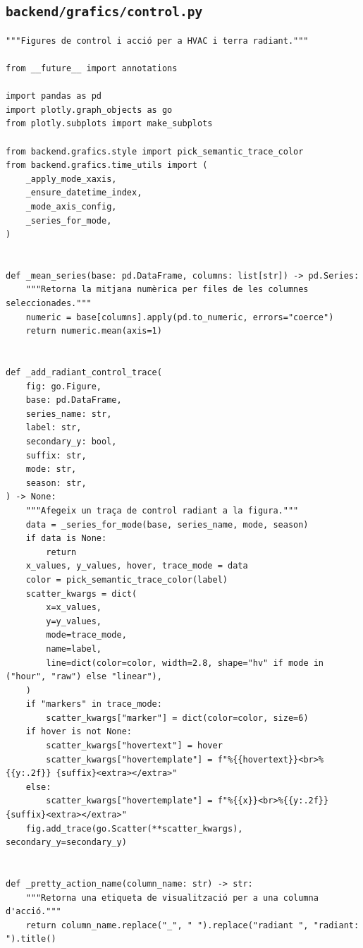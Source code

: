 \documentclass[10pt,a4paper]{article}
\begin{document}

\subsection{\texorpdfstring{\texttt{backend/grafics/control.py}}{backend/grafics/control.py}}

\begin{lstlisting}[style=studioPython,caption={backend/grafics/control.py},label={lst:backend-grafics-control-py}]
"""Figures de control i acció per a HVAC i terra radiant."""

from __future__ import annotations

import pandas as pd
import plotly.graph_objects as go
from plotly.subplots import make_subplots

from backend.grafics.style import pick_semantic_trace_color
from backend.grafics.time_utils import (
    _apply_mode_xaxis,
    _ensure_datetime_index,
    _mode_axis_config,
    _series_for_mode,
)


def _mean_series(base: pd.DataFrame, columns: list[str]) -> pd.Series:
    """Retorna la mitjana numèrica per files de les columnes seleccionades."""
    numeric = base[columns].apply(pd.to_numeric, errors="coerce")
    return numeric.mean(axis=1)


def _add_radiant_control_trace(
    fig: go.Figure,
    base: pd.DataFrame,
    series_name: str,
    label: str,
    secondary_y: bool,
    suffix: str,
    mode: str,
    season: str,
) -> None:
    """Afegeix un traça de control radiant a la figura."""
    data = _series_for_mode(base, series_name, mode, season)
    if data is None:
        return
    x_values, y_values, hover, trace_mode = data
    color = pick_semantic_trace_color(label)
    scatter_kwargs = dict(
        x=x_values,
        y=y_values,
        mode=trace_mode,
        name=label,
        line=dict(color=color, width=2.8, shape="hv" if mode in ("hour", "raw") else "linear"),
    )
    if "markers" in trace_mode:
        scatter_kwargs["marker"] = dict(color=color, size=6)
    if hover is not None:
        scatter_kwargs["hovertext"] = hover
        scatter_kwargs["hovertemplate"] = f"%{{hovertext}}<br>%{{y:.2f}} {suffix}<extra></extra>"
    else:
        scatter_kwargs["hovertemplate"] = f"%{{x}}<br>%{{y:.2f}} {suffix}<extra></extra>"
    fig.add_trace(go.Scatter(**scatter_kwargs), secondary_y=secondary_y)


def _pretty_action_name(column_name: str) -> str:
    """Retorna una etiqueta de visualització per a una columna d'acció."""
    return column_name.replace("_", " ").replace("radiant ", "radiant: ").title()



\end{lstlisting}
\end{document}
